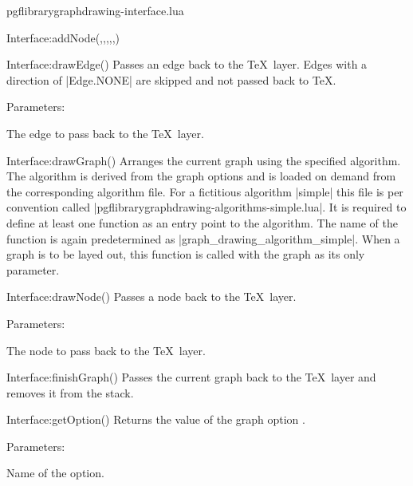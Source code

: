 \begin{filedescription}{pgflibrarygraphdrawing-interface.lua}
\begin{luacommand}{{Interface:addNode}(,,,,,)}
\end{luacommand}
\begin{luacommand}{{Interface:drawEdge}()}
Passes an edge back to the \TeX\ layer.  Edges with a direction of |Edge.NONE| are skipped and not passed back to \TeX. 

Parameters:
\begin{parameterdescription}
	\item[\meta{edge}] The edge to pass back to the \TeX\ layer. 
\end{parameterdescription}



\end{luacommand}
\begin{luacommand}{{Interface:drawGraph}()}
Arranges the current graph using the specified algorithm.  The algorithm is derived from the graph options and is loaded on demand from the corresponding algorithm file. For a fictitious algorithm |simple| this file is per convention called |pgflibrarygraphdrawing-algorithms-simple.lua|. It is required to define at least one function as an entry point to the algorithm. The name of the function is again predetermined as |graph_drawing_algorithm_simple|. When a graph is to be layed out, this function is called with the graph as its only parameter. 



\end{luacommand}
\begin{luacommand}{{Interface:drawNode}()}
Passes a node back to the \TeX\ layer. 

Parameters:
\begin{parameterdescription}
	\item[\meta{node}] The node to pass back to the \TeX\ layer. 
\end{parameterdescription}



\end{luacommand}
\begin{luacommand}{{Interface:finishGraph}()}
Passes the current graph back to the \TeX\ layer and removes it from the stack. 



\end{luacommand}
\begin{luacommand}{{Interface:getOption}()}
Returns the value of the graph option . 

Parameters:
\begin{parameterdescription}
	\item[\meta{name}] Name of the option. 
\end{parameterdescription}



\end{luacommand}
\end{filedescription}
